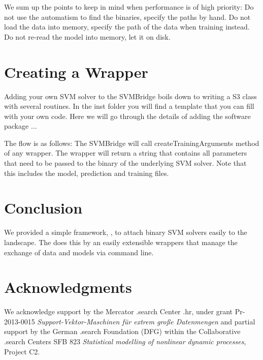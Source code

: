 \documentclass[article, shortnames]{jss}
\begin{document}
We sum up the points to keep in mind when performance is of high priority:
Do not use the automatism to find the binaries, specify the paths by hand.
Do not load the data into memory, specify the path of the data when training instead.
Do not re-read the model into memory, let it on disk.



\section{Creating a Wrapper}

Adding your own SVM solver to the SVMBridge boils down to
writing a S3 class with several routines. In the inst folder you will find
a template that you can fill with your own code. Here we will go
through the details of adding the software package ...

The flow is as follows: The SVMBridge will call 
createTrainingArguments method of any wrapper. The wrapper
will return a string that contains all parameters that need to be
passed to the binary of the underlying SVM solver. Note that
this includes the model, prediction and training files.



\section{Conclusion}

We provided a simple framework, , to attach binary SVM solvers easily to the  landscape.
The  does this by an easily extensible wrappers that manage the exchange of data and models
via command line.



\section*{Acknowledgments}

We acknowledge support by the Mercator  .search Center  .hr,
under grant Pr-2013-0015 \textit{Support-Vektor-Maschinen f{\"u}r extrem gro{\ss}e Datenmengen} and
partial support by the German  .search Foundation (DFG) within the Collaborative  .search Centers SFB 823
\textit{Statistical modelling of nonlinear dynamic processes}, Project C2.



\end{document}
